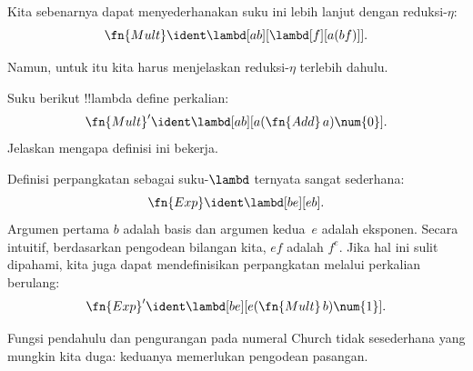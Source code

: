 \documentclass[../../../include/open-logic-section]{subfiles}
\begin{document}
\begin{editorial}
Kita sebenarnya dapat menyederhanakan suku ini lebih lanjut dengan
reduksi-$\eta$:
\[
  \fn{Mult} \ident \lambd[ab][\lambd[f][a (b f)]].
\]

Namun, untuk itu kita harus menjelaskan reduksi-$\eta$ terlebih dahulu.
\end{editorial}

\begin{prob}
Suku berikut !!{lambda define} perkalian:
\[
  \fn{Mult}' \ident \lambd[ab][a (\fn{Add}\, a) \num{0}].
\]
Jelaskan mengapa definisi ini bekerja.
\end{prob}

Definisi perpangkatan sebagai suku-$\lambd$ ternyata sangat sederhana:
\[
  \fn{Exp} \ident \lambd[be][e b].
\]
Argumen pertama $b$ adalah basis dan argumen kedua~$e$ adalah eksponen.
Secara intuitif, berdasarkan pengodean bilangan kita, $e f$ adalah $f^e$.
Jika hal ini sulit dipahami, kita juga dapat mendefinisikan perpangkatan
melalui perkalian berulang:
\[
  \fn{Exp}' \ident \lambd[be][e (\fn{Mult}\, b) \num{1}].
\]

Fungsi pendahulu dan pengurangan pada numeral Church tidak sesederhana yang
mungkin kita duga: keduanya memerlukan pengodean pasangan.
\end{document}
